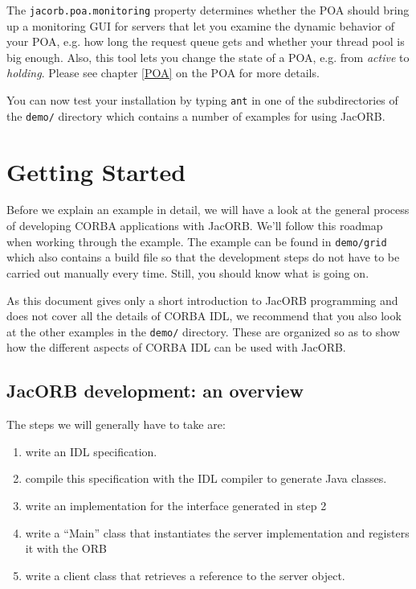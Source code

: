 \documentclass[12pt]{scrbook}
\begin{document}
The  {\tt jacorb.poa.monitoring} property  determines whether  the POA
should bring up a monitoring GUI  for servers that let you examine the
dynamic behavior of  your POA, e.g.  how long  the request queue gets
and whether your thread pool is  big enough.  Also, this tool lets you
change the  state of a POA,  e.g. from {\it active}  to {\it holding}.
Please see chapter \ref{POA} on the POA for more details.

You can now test your installation  by typing {\tt ant} in one of the
subdirectories of the {\tt demo/} directory which contains a number of
examples for using JacORB.
    

\chapter{Getting Started}
\label{start}

Before we  explain an example  in detail, we  will have a look  at the
general process  of developing  CORBA applications with  JacORB. We'll
follow this roadmap when working through the example.  The example can
be found in  {\tt demo/grid} which also contains a  build file so that
the development  steps do  not have to  be carried out  manually every
time.  Still, you should know what is going on.

As this document gives only a short introduction to JacORB programming
and does not cover all the details of CORBA IDL, we recommend that you
also look at  the other examples in the  {\tt demo/} directory.  These
are organized so as to show how the different aspects of CORBA IDL can
be used with JacORB.

\section{JacORB development: an overview}

The steps we will generally have to take are:

\begin{enumerate}
    \item  write an IDL specification.
    \item  compile this specification with the IDL compiler to generate Java classes.
    \item write an implementation for the interface generated in step
      2
    \item  write a ``Main'' class that instantiates the server implementation
        and registers it with the ORB
    \item  write a client class that retrieves a reference to the server object.
\end{enumerate}
\end{document}
